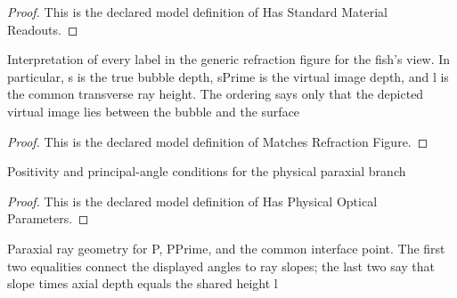 \begin{proof}
  This is the declared model definition of Has Standard Material Readouts.
\end{proof}
\begin{definition}
  \label{def:physics:phyx-mini-0158:phyxminiproblems-problemphyxmini0158-matchesrefractionfigure}
  Interpretation of every label in the generic refraction figure for the fish's view. In particular, s is the true bubble depth, sPrime is the virtual image depth, and l is the common transverse ray height. The ordering says only that the depicted virtual image lies between the bubble and the surface
\end{definition}
\begin{proof}
  This is the declared model definition of Matches Refraction Figure.
\end{proof}
\begin{definition}
  \label{def:physics:phyx-mini-0158:phyxminiproblems-problemphyxmini0158-hasphysicalopticalparameters}
  Positivity and principal-angle conditions for the physical paraxial branch
\end{definition}
\begin{proof}
  This is the declared model definition of Has Physical Optical Parameters.
\end{proof}
\begin{definition}
  \label{def:physics:phyx-mini-0158:phyxminiproblems-problemphyxmini0158-hasparaxialraygeometry}
  Paraxial ray geometry for P, PPrime, and the common interface point. The first two equalities connect the displayed angles to ray slopes; the last two say that slope times axial depth equals the shared height l
\end{definition}
